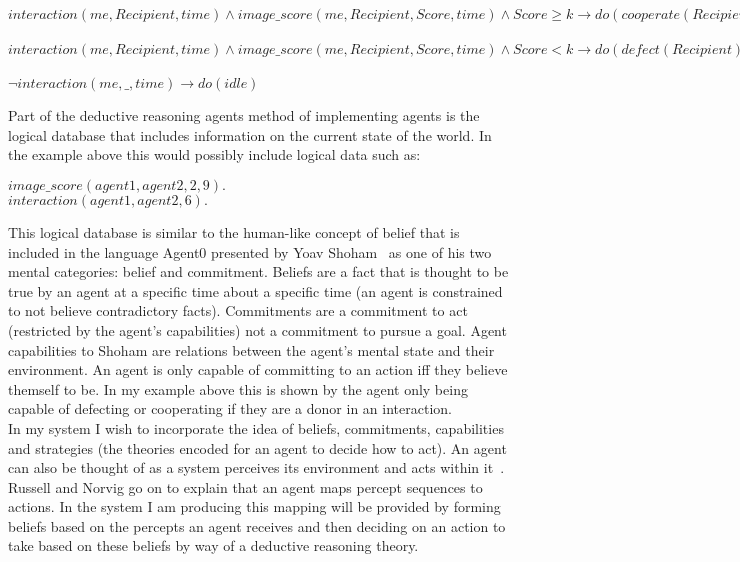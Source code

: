 \documentclass[twoside,twocolumn]{article}
\begin{document}
\begin{framed}
\noindent$interaction(me, Recipient, time) \wedge image\_score(me, Recipient, Score, time) \wedge Score\geq k \to do(cooperate(Recipient))$\\\\
$interaction(me, Recipient, time) \wedge image\_score(me, Recipient, Score, time) \wedge Score<k \to do(defect(Recipient))$\\\\
$\neg interaction(me, \_, time) \to do(idle)$
\end{framed}
Part of the deductive reasoning agents method of implementing agents is the logical database that includes information on the current state of the world. In the example above this would possibly include logical data such as:
\begin{framed}
\begin{center}
$image\_score(agent1, agent2, 2, 9).$ \\
$interaction(agent1, agent2, 6).$
\end{center}
\end{framed}
This logical database is similar to the human-like concept of belief that is included in the language Agent0 presented by Yoav Shoham~\cite{shoham1991agent0} as one of his two mental categories: belief and commitment. Beliefs are a fact that is thought to be true by an agent at a specific time about a specific time (an agent is constrained to not believe contradictory facts). Commitments are a commitment to act (restricted by the agent's capabilities) not a commitment to pursue a goal. Agent capabilities to Shoham are relations between the agent's mental state and their environment. An agent is only capable of committing to an action iff they believe themself to be. In my example above this is shown by the agent only being capable of defecting or cooperating if they are a donor in an interaction.\\
In my system I wish to incorporate the idea of beliefs, commitments, capabilities and strategies (the theories encoded for an agent to decide how to act). An agent can also be thought of as a system perceives its environment and acts within it~\cite{russell2016artificial}. Russell and Norvig go on to explain that an agent maps percept sequences to actions. In the system I am producing this mapping will be provided by forming beliefs based on the percepts an agent receives and then deciding on an action to take based on these beliefs by way of a deductive reasoning theory.\\
\end{document}
